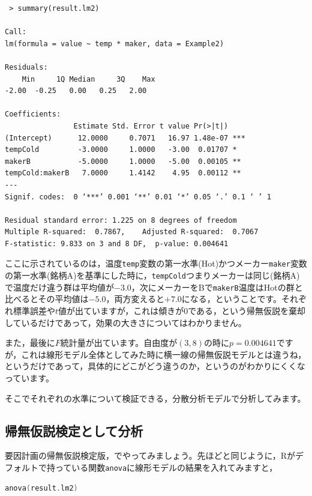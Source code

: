 \documentclass{ltjsarticle}
\begin{document}
\begin{tcolorbox}
\begin{verbatim}
 > summary(result.lm2)

Call:
lm(formula = value ~ temp * maker, data = Example2)
 
Residuals:
    Min     1Q Median     3Q    Max 
-2.00  -0.25   0.00   0.25   2.00 

Coefficients:
                Estimate Std. Error t value Pr(>|t|)    
(Intercept)      12.0000     0.7071   16.97 1.48e-07 ***
tempCold         -3.0000     1.0000   -3.00  0.01707 *  
makerB           -5.0000     1.0000   -5.00  0.00105 ** 
tempCold:makerB   7.0000     1.4142    4.95  0.00112 ** 
---
Signif. codes:  0 ‘***’ 0.001 ‘**’ 0.01 ‘*’ 0.05 ‘.’ 0.1 ‘ ’ 1

Residual standard error: 1.225 on 8 degrees of freedom
Multiple R-squared:  0.7867,	Adjusted R-squared:  0.7067 
F-statistic: 9.833 on 3 and 8 DF,  p-value: 0.004641
\end{verbatim}
\end{tcolorbox}
ここに示されているのは，温度\texttt{temp}変数の第一水準(Hot)かつメーカー\texttt{maker}変数の第一水準(銘柄A)を基準にした時に，\texttt{tempCold}つまりメーカーは同じ(銘柄A)で温度だけ違う群は平均値が$-3.0$，次にメーカーをBで\texttt{makerB}温度はHotの群と比べるとその平均値は$-5.0$，両方変えると$+7.0$になる，ということです。それぞれ標準誤差や$t$値が出ていますが，これは傾きが0である，という帰無仮説を棄却しているだけであって，効果の大きさについてはわかりません。

また，最後に$F$統計量が出ています。自由度が$(3,8)$の時に$p=0.004641$ですが，これは線形モデル全体としてみた時に横一線の帰無仮説モデルとは違うね，というだけであって，具体的にどこがどう違うのか，というのがわかりにくくなっています。

そこでそれぞれの水準について検証できる，分散分析モデルで分析してみます。
\subsection{帰無仮説検定として分析}
要因計画の帰無仮説検定版，でやってみましょう。先ほどと同じように，Rがデフォルトで持っている関数\texttt{anova}に線形モデルの結果を入れてみますと，
\begin{lstlisting}[language=c++]
anova(result.lm2)
\end{lstlisting}
\end{document}
